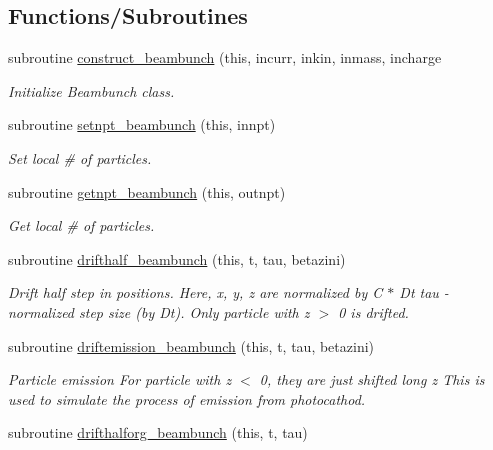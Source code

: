 \subsection*{Functions/\+Subroutines}
\begin{DoxyCompactItemize}
\item 
subroutine \mbox{\hyperlink{namespacebeambunchclass_a1605e527eb41043dc5962da1e3bb5159}{construct\+\_\+beambunch}} (this, incurr, inkin, inmass, incharge
\begin{DoxyCompactList}\small\item\em Initialize Beambunch class. \end{DoxyCompactList}\item 
subroutine \mbox{\hyperlink{namespacebeambunchclass_af1b14b706bd1283ff6c5a7cec4b06c48}{setnpt\+\_\+beambunch}} (this, innpt)
\begin{DoxyCompactList}\small\item\em Set local \# of particles. \end{DoxyCompactList}\item 
subroutine \mbox{\hyperlink{namespacebeambunchclass_aec332b229b76111b68db82b20ab2846e}{getnpt\+\_\+beambunch}} (this, outnpt)
\begin{DoxyCompactList}\small\item\em Get local \# of particles. \end{DoxyCompactList}\item 
subroutine \mbox{\hyperlink{namespacebeambunchclass_a269bbe3913214953b92f55253daa5b16}{drifthalf\+\_\+beambunch}} (this, t, tau, betazini)
\begin{DoxyCompactList}\small\item\em Drift half step in positions. Here, x, y, z are normalized by C $\ast$ Dt tau -\/ normalized step size (by Dt). Only particle with z $>$ 0 is drifted. \end{DoxyCompactList}\item 
subroutine \mbox{\hyperlink{namespacebeambunchclass_a2c80320f40c450b5384dfd16c76bcc6a}{driftemission\+\_\+beambunch}} (this, t, tau, betazini)
\begin{DoxyCompactList}\small\item\em Particle emission For particle with z $<$ 0, they are just shifted long z This is used to simulate the process of emission from photocathod. \end{DoxyCompactList}\item 
subroutine \mbox{\hyperlink{namespacebeambunchclass_a1a12151be16b0be8122e01c579035ddd}{drifthalforg\+\_\+beambunch}} (this, t, tau)

\end{DoxyCompactItemize}
